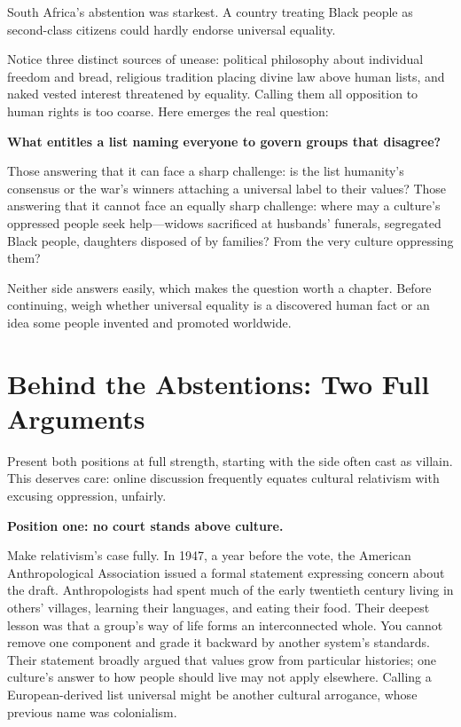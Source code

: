 South Africa's abstention was starkest. A country treating Black people as second-class citizens could hardly endorse universal equality.

Notice three distinct sources of unease: political philosophy about individual freedom and bread, religious tradition placing divine law above human lists, and naked vested interest threatened by equality. Calling them all opposition to human rights is too coarse. Here emerges the real question:

\textbf{What entitles a list naming everyone to govern groups that disagree?}

Those answering that it can face a sharp challenge: is the list humanity's consensus or the war's winners attaching a universal label to their values? Those answering that it cannot face an equally sharp challenge: where may a culture's oppressed people seek help---widows sacrificed at husbands' funerals, segregated Black people, daughters disposed of by families? From the very culture oppressing them?

Neither side answers easily, which makes the question worth a chapter. Before continuing, weigh whether universal equality is a discovered human fact or an idea some people invented and promoted worldwide.

\section[Abstentions: Two Full Arguments]{Behind the Abstentions: Two Full Arguments}
Present both positions at full strength, starting with the side often cast as villain. This deserves care: online discussion frequently equates cultural relativism with excusing oppression, unfairly.

\textbf{Position one: no court stands above culture.}

Make relativism's case fully. In 1947, a year before the vote, the American Anthropological Association issued a formal statement expressing concern about the draft. Anthropologists had spent much of the early twentieth century living in others' villages, learning their languages, and eating their food. Their deepest lesson was that a group's way of life forms an interconnected whole. You cannot remove one component and grade it backward by another system's standards. Their statement broadly argued that values grow from particular histories; one culture's answer to how people should live may not apply elsewhere. Calling a European-derived list universal might be another cultural arrogance, whose previous name was colonialism.

